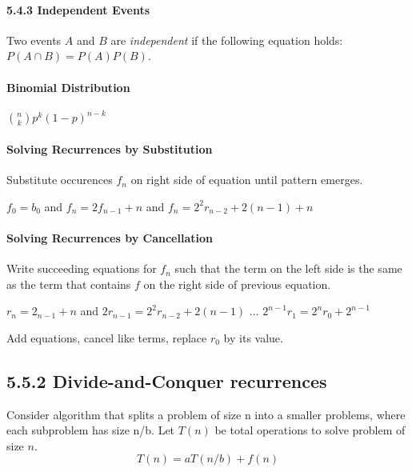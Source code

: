 \documentclass[10pt,twocolumn]{article}
\begin{document}
	\paragraph*{5.4.3 Independent Events}
	Two events $A$ and $B$ are \emph{independent} if the following
        equation holds: $P(A \cap B)=P(A)P(B)$.
	
	\paragraph*{Binomial Distribution}
	$\binom{n}{k}p^k(1-p)^{n-k}$

	\paragraph*{Solving Recurrences by Substitution}
	Substitute occurences $f_n$ on right side of equation until pattern emerges.
	\begin{flushleft}$f_0=b_0$ and $f_n=2f_{n-1}+n$ and $f_n=2^2r_{n-2}+2(n-1)+n$\end{flushleft}
	
	\paragraph*{Solving Recurrences by Cancellation}
	Write succeeding equations for $f_n$ such that the term on the
        left side is the same as the term that contains $f$ on the
        right side of previous equation.
        \begin{flushleft}$r_n=2_{n-1}+n$ and
          $2r_{n-1}=2^2r_{n-2}+2(n-1)$
          $\ldots$ $2^{n-1}r_1=2^nr_0+2^{n-1}$
        \end{flushleft}
	Add equations, cancel like terms, replace $r_0$ by its value.
	
	\subsection*{5.5.2 Divide-and-Conquer recurrences}
	Consider algorithm that splits a problem of size n into a smaller problems, where each subproblem has size n/b.  Let $T(n)$ be total operations to solve problem of size $n$.
		\[T(n)=aT(n/b)+f(n)\]
	
\end{document}
